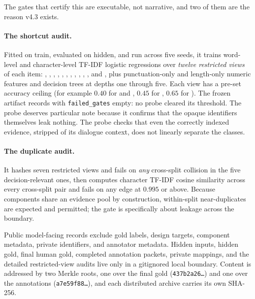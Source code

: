 The gates that certify this are executable, not narrative, and two of them are
the reason v4.3 exists.

\paragraph{The shortcut audit.} Fitted on train, evaluated on hidden, and run
across five seeds, it trains word-level and character-level TF-IDF logistic
regressions over \emph{twelve restricted views} of each item:
, ,
,
, , ,
, ,
, ,
, and , plus
punctuation-only and length-only numeric features and decision trees at depths
one through five. Each view has a pre-set accuracy ceiling (for example $0.40$
for  and , $0.45$ for
, $0.65$ for ). The frozen artifact records
with \texttt{failed\_gates} empty: no probe cleared its threshold. The
 probe deserves particular note because it confirms that the opaque
identifiers themselves leak nothing. The  probe
checks that even the correctly indexed evidence, stripped of its
dialogue context, does not linearly separate the classes.

\paragraph{The duplicate audit.} It hashes seven restricted views and fails on
\emph{any} cross-split collision in the five decision-relevant ones, then
computes character TF-IDF cosine similarity across every cross-split pair and
fails on any edge at $0.995$ or above. Because components share an evidence
pool by construction, within-split near-duplicates are expected and permitted;
the gate is specifically about leakage across the boundary.

Public model-facing records exclude gold labels, design targets, component
metadata, private identifiers, and annotator metadata. Hidden inputs, hidden
gold, final human gold, completed annotation packets, private mappings, and the
detailed restricted-view audits live only in a gitignored local boundary.
Content is addressed by two Merkle roots, one over the final gold
(\texttt{437b2a26\dots}) and one over the annotations
(\texttt{a7e59f88\dots}), and each distributed archive carries its own SHA-256.

